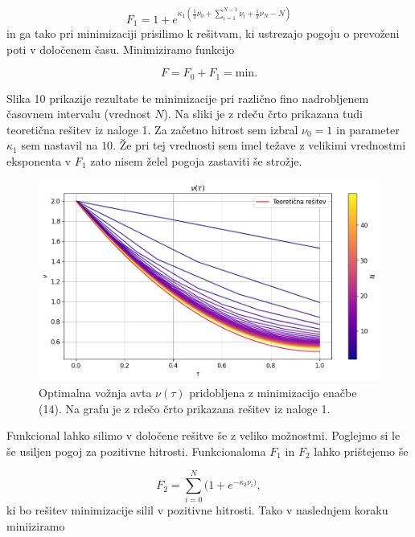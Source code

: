\documentclass[slovene,11pt,a4paper]{article}
\begin{document}
\begin{equation}
F_1 = 1 + e^{\kappa_1 \left( \frac{1}{2} \nu_0 + \sum_{i=1}^{N-1} \nu_i + \frac{1}{2} \nu_N - N \right)}
\end{equation}
in ga tako pri minimizaciji prisilimo k rešitvam, ki ustrezajo pogoju o prevoženi poti v določenem času. Minimiziramo funkcijo

\begin{equation}
F = F_0 + F_1 = \text{min}.
\end{equation}

Slika 10 prikazije rezultate te minimizacije pri različno fino nadrobljenem časovnem intervalu (vrednost $N$). Na sliki je z rdeču črto prikazana tudi teoretična rešitev iz naloge 1. Za začetno hitrost sem izbral $\nu_0 = 1$ in parameter $\kappa_1$ sem nastavil na $10$. Že pri tej vrednosti sem imel težave z velikimi vrednostmi eksponenta v $F_1$ zato nisem želel pogoja zastaviti še strožje.

\newpage

\begin{figure}[h!]
\centering
\includegraphics[width=12.5cm]{avto.png}
\caption{Optimalna vožnja avta $\nu(\tau)$ pridobljena z minimizacijo enačbe (14). Na grafu je z rdečo črto prikazana rešitev iz naloge 1.}
\end{figure}

Funkcional lahko silimo v določene rešitve še z veliko možnostmi. Poglejmo si le še usiljen pogoj za pozitivne hitrosti. Funkcionaloma $F_1$ in $F_2$ lahko prištejemo še

\begin{equation}
F_2 = \sum_{i=0}^{N} (1+e^{-\kappa_2 \nu_i)},
\end{equation}
ki bo rešitev minimizacije silil v pozitivne hitrosti. Tako v naslednjem koraku miniiziramo
\end{document}
